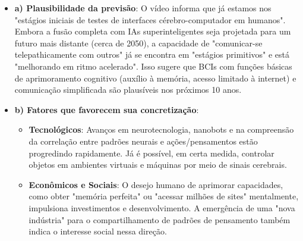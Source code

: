 \documentclass[a4paper,12pt]{article}
\begin{document}
\begin{itemize}
\item \textbf{a) Plausibilidade da previsão}: O vídeo informa que já estamos nos "estágios iniciais de testes de interfaces cérebro-computador em humanos". Embora a fusão completa com IAs superinteligentes seja projetada para um futuro mais distante (cerca de 2050), a capacidade de "comunicar-se telepathicamente com outros" já se encontra em "estágios primitivos" e está "melhorando em ritmo acelerado". Isso sugere que BCIs com funções básicas de aprimoramento cognitivo (auxílio à memória, acesso limitado à internet) e comunicação simplificada são plausíveis nos próximos 10 anos.

\item \textbf{b) Fatores que favorecem sua concretização}:
  \begin{itemize}
  \item \textbf{Tecnológicos}: Avanços em neurotecnologia, nanobots e na compreensão da correlação entre padrões neurais e ações/pensamentos estão progredindo rapidamente. Já é possível, em certa medida, controlar objetos em ambientes virtuais e máquinas por meio de sinais cerebrais.
  \item \textbf{Econômicos e Sociais}: O desejo humano de aprimorar capacidades, como obter "memória perfeita" ou "acessar milhões de sites" mentalmente, impulsiona investimentos e desenvolvimento. A emergência de uma "nova indústria" para o compartilhamento de padrões de pensamento também indica o interesse social nessa direção.
  \end{itemize}
\end{itemize}



\end{document}
